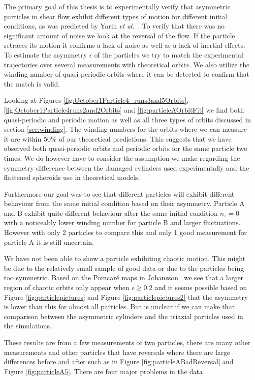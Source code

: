 The primary goal of this thesis is to experimentally verify that asymmetric particles in shear flow exhibit different types of motion for different initial conditions, as was predicted by Yarin \emph{et al.}~\cite{Yarin}. To verify that there was no significant amount of noise we look at the reversal of the flow. If the particle retraces its motion it confirms a lack of noise as well as a lack of inertial effects. To estimate the asymmetry $\epsilon$ of the particles we try to match the experimental trajectories over several measurements with theoretical orbits. We also utilize the winding number of quasi-periodic orbits where it can be detected to confirm that the match is valid.

Looking at Figures \ref{fig:October1Particle4_runs3and5Orbits}, \ref{fig:October1Particle4runs2and2Orbits} and \ref{fig:particleAOrbitFit} we find both quasi-periodic and periodic motion as well as all three types of orbits discussed in section \ref{sec:winding}. The winding numbers for the orbits where we can measure it are within $50\%$ of our theoretical predictions. This suggests that we have observed both quasi-periodic orbits and periodic orbits for the same particle two times. We do however have to consider the assumption we make regarding the symmetry difference between the damaged cylinders used experimentally and the flattened spheroids use in theoretical models.

Furthermore our goal was to see that different particles will exhibit different behaviour from the same initial condition based on their asymmetry. Particle A and B exhibit quite different behaviour after the same initial condition $n_z = 0$ with a noticeably lower winding number for particle B and larger fluctuations. However with only 2 particles to compare this and only 1 good measurement for particle A it is still uncertain. 

We have not been able to show a particle exhibiting chaotic motion. This might be due to the relatively small sample of good data or due to the particles being too symmetric. Based on the Poincaré maps in Johansson~\cite{AntonThesis} we see that a larger region of chaotic orbits only appear when $\epsilon \geq 0.2$ and it seems possible based on Figure \ref{fig:particlepictures} and Figure \ref{fig:particlepictures2} that the asymmetry is lower than this for almost all particles. But is unclear if we can make that comparison between the asymmetric cylinders and the triaxial particles used in the simulations. 

These results are from a few measurements of two particles, there are many other measurements and other particles that have reversals where there are large differences before and after such as in Figure \ref{fig:particleABadReversal} and Figure \ref{fig:particleA5}. There are four major problems in the data 

